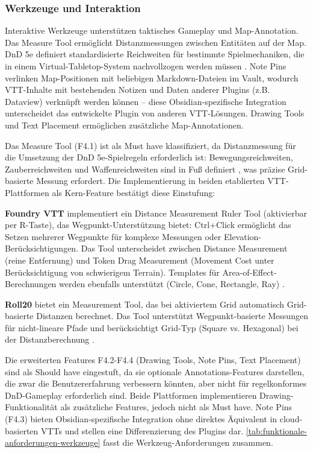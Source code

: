 \subsubsection{Werkzeuge und Interaktion}

Interaktive Werkzeuge unterstützen taktisches Gameplay und Map-Annotation. Das Measure Tool ermöglicht Distanzmessungen zwischen Entitäten auf der Map. \ac{DnD} 5e definiert standardisierte Reichweiten für bestimmte Spielmechaniken, die in einem Virtual-Tabletop-System nachvollzogen werden müssen \autocite{DnDBasicRules2014}. Note Pins verlinken Map-Positionen mit beliebigen Markdown-Dateien im Vault, wodurch \ac{VTT}-Inhalte mit bestehenden Notizen und Daten anderer Plugins (z.B. Dataview) verknüpft werden können -- diese Obsidian-spezifische Integration unterscheidet das entwickelte Plugin von anderen \ac{VTT}-Lösungen. Drawing Tools und Text Placement ermöglichen zusätzliche Map-Annotationen.

Das Measure Tool (F4.1) ist als Must have klassifiziert, da Distanzmessung für die Umsetzung der \ac{DnD} 5e-Spielregeln erforderlich ist: Bewegungsreichweiten, Zauberreichweiten und Waffenreichweiten sind in Fuß definiert \autocite{DnDBasicRules2014}, was präzise Grid-basierte Messung erfordert. Die Implementierung in beiden etablierten \ac{VTT}-Plattformen als Kern-Feature bestätigt diese Einstufung:

\textbf{Foundry \ac{VTT}} implementiert ein Distance Measurement Ruler Tool (aktivierbar per R-Taste), das Wegpunkt-Unterstützung bietet: Ctrl+Click ermöglicht das Setzen mehrerer Wegpunkte für komplexe Messungen oder Elevation-Berücksichtigungen. Das Tool unterscheidet zwischen Distance Measurement (reine Entfernung) und Token Drag Measurement (Movement Cost unter Berücksichtigung von schwierigem Terrain). Templates für Area-of-Effect-Berechnungen werden ebenfalls unterstützt (Circle, Cone, Rectangle, Ray) \autocite{FoundryMeasurement2024}.

\textbf{Roll20} bietet ein Measurement Tool, das bei aktiviertem Grid automatisch Grid-basierte Distanzen berechnet. Das Tool unterstützt Wegpunkt-basierte Messungen für nicht-lineare Pfade und berücksichtigt Grid-Typ (Square vs. Hexagonal) bei der Distanzberechnung \autocite{Roll20Graphics2024}.

Die erweiterten Features F4.2-F4.4 (Drawing Tools, Note Pins, Text Placement) sind als Should have eingestuft, da sie optionale Annotations-Features darstellen, die zwar die Benutzererfahrung verbessern könnten, aber nicht für regelkonformes \ac{DnD}-Gameplay erforderlich sind. Beide Plattformen implementieren Drawing-Funktionalität als zusätzliche Features, jedoch nicht als Must have. Note Pins (F4.3) bieten Obsidian-spezifische Integration ohne direktes Äquivalent in cloud-basierten VTTs und stellen eine Differenzierung des Plugins dar. \autoref{tab:funktionale-anforderungen-werkzeuge} fasst die Werkzeug-Anforderungen zusammen.

